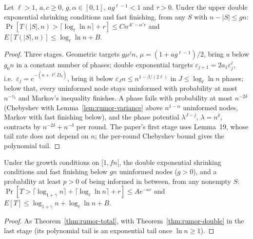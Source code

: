 \begin{theorem}\label{thm:rumor-double}
\leanok{}
Let $\ell>1$, $a,c\ge0$, $g,\alpha\in[0,1]$, $ag^{\ell-1}<1$ and $\tau>0$. Under the upper double
exponential shrinking conditions and fast finishing, from any $S$ with $n-|S|\le gn$:
$\Pr[T(|S|,n)>\lceil\log_\ell\ln n\rceil+r]\le Cn^{A'-\alpha'r}$ and
$E[T(|S|,n)]\le\log_\ell\ln n+B$.
\end{theorem}
\begin{proof}\leanok
Three stages. Geometric targets $g\mu^jn$, $\mu=(1+ag^{\ell-1})/2$, bring $u$ below $g_0n$ in a
constant number of phases; double exponential targets $\varepsilon_{j+1}=2a_1\varepsilon_j^\ell$,
i.e.\ $\varepsilon_j=e^{-(\kappa+\ell^jD_0)}$, bring it below $\varepsilon_Jn\le n^{1-\beta/(2\ell)}$
in $J\le\log_\ell\ln n$ phases; below that, every uninformed node stays uninformed with
probability at most $n^{-\tau_3}$ and Markov's inequality finishes. A phase fails with
probability at most $n^{-2\delta}$ (Chebyshev with Lemma~\ref{lem:rumor-variance} above
$n^{1-\alpha}$ uninformed nodes, Markov with fast finishing below), and the phase potential
$\lambda^{J-j}$, $\lambda=n^\delta$, contracts by $n^{-2\delta}+n^{-\delta}$ per round. The
paper's first stage uses Lemma~19, whose tail rate does not depend on $n$; the per-round
Chebyshev bound gives the polynomial tail.
\end{proof}

\begin{theorem}\label{thm:rumor-total-double}
\leanok{}
Under the growth conditions on $[1,fn[$, the double exponential shrinking conditions and fast
finishing below $gn$ uninformed nodes ($g>0$), and a probability at least $p>0$ of being informed
in between, from any nonempty $S$:
$\Pr[T>\lceil\log_{1+\gamma}n\rceil+\lceil\log_\ell\ln n\rceil+r]\le Ae^{-\kappa r}$ and
$E[T]\le\log_{1+\gamma}n+\log_\ell\ln n+B$.
\end{theorem}
\begin{proof}\leanok
As Theorem~\ref{thm:rumor-total}, with Theorem~\ref{thm:rumor-double} in the last stage (its
polynomial tail is an exponential tail once $\ln n\ge1$).
\end{proof}

